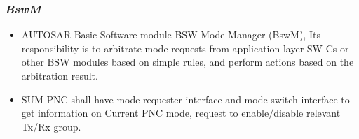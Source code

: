\subsubsection{\textit{BswM}}
\begin{itemize}
	\item AUTOSAR Basic Software module BSW Mode Manager (BswM), Its responsibility is to arbitrate mode requests from application layer SW-Cs or other BSW modules based on simple rules, and perform actions based on the arbitration result.
	\item SUM PNC shall have mode requester interface and mode switch interface to get information on Current PNC mode, request to enable/disable relevant Tx/Rx group.
	
	
	
	

\end{itemize}
